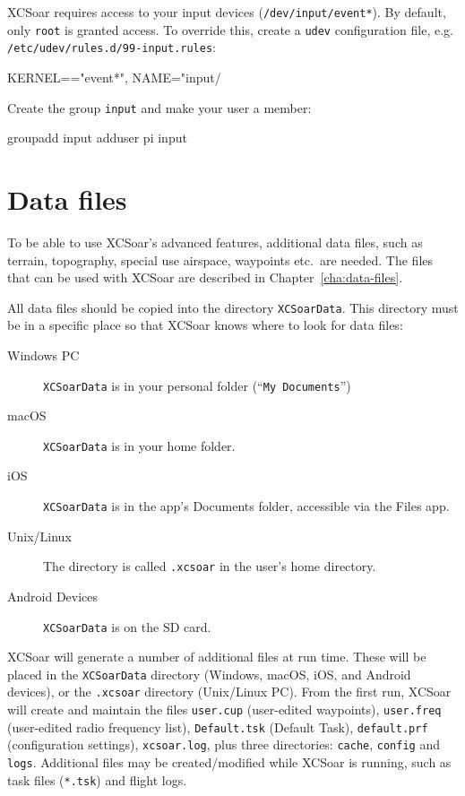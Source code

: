XCSoar requires access to your input devices
(\texttt{/dev/input/event*}).  By default, only \texttt{root} is
granted access.  To override this, create a \texttt{udev}
configuration file, e.g. \texttt{/etc/udev/rules.d/99-input.rules}:

\begin{verbatim*}
KERNEL=="event*", NAME="input/%
\end{verbatim*}

Create the group \texttt{input} and make your user a member:

\begin{verbatim*}
groupadd input
adduser pi input
\end{verbatim*}

\section{Data files}\label{sec:data files}

To be able to use XCSoar's advanced features, additional data files, such as
terrain, topography, special use airspace, waypoints etc.\ are needed. The files
that can be used with XCSoar are described in Chapter~\ref{cha:data-files}.

All data files should be copied into the directory
\texttt{XCSoarData}.  This directory must be in a specific place
so that XCSoar knows where to look for data files:

\begin{description}
\item[Windows PC]
\texttt{XCSoarData} is in your personal folder (``\texttt{My
Documents}'')
\item[macOS]
\texttt{XCSoarData} is in your home folder.
\item[iOS]
\texttt{XCSoarData} is in the app's Documents folder, accessible via
the Files app.
\item[Unix/Linux]
The directory is called \verb|.xcsoar| in the user's home directory.
\item[Android Devices]
\texttt{XCSoarData} is on the SD card.
\end{description}


XCSoar will generate a number of additional files at run time.  These
will be placed in the  \texttt{XCSoarData} directory (Windows, macOS,
iOS, and Android devices), or the \texttt{.xcsoar} directory (Unix/Linux
PC).  From the first run, XCSoar will create and maintain the files
\texttt{user.cup} (user-edited waypoints),
\texttt{user.freq} (user-edited radio frequency list),
\texttt{Default.tsk} (Default Task),  
\texttt{default.prf} 
(configuration settings),
\texttt{xcsoar.log}, 
plus three directories: \texttt{cache},
\texttt{config} and \texttt{logs}.  Additional files may be
created/modified while XCSoar is running, such as task files
(\texttt{*.tsk}) and flight logs.


